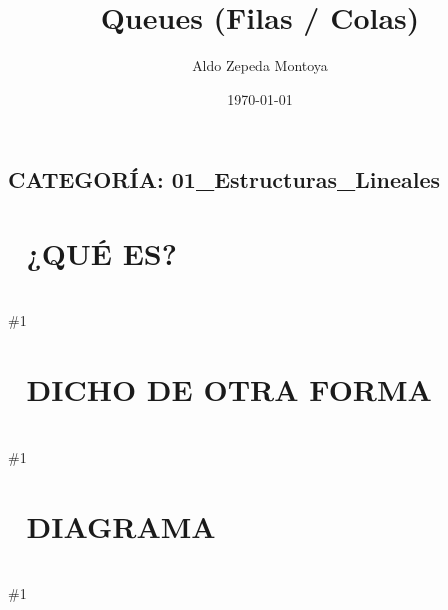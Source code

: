 \documentclass{article}
\newcommand{\quees}[1]{
    \section*{🤔 ¿QUÉ ES?}
    \hrulefill \\
    \#1
}
\newcommand{\dichodeotraforma}[1]{
    \section*{💬 DICHO DE OTRA FORMA}
    \hrulefill \\
    \#1
}
\newcommand{\diagrama}[1]{
    \section*{🎨 DIAGRAMA}
    \hrulefill \\
    \#1
}
\begin{document}
\title{Queues (Filas / Colas)}
\author{Aldo Zepeda Montoya}
\date{\today}
\maketitle

\subsection*{CATEGORÍA: 01\_Estructuras\_Lineales}

\quees{
La fila para entrar al cine 🎟️ o al banco 🏦. El primero que llega 
es el primero en ser atendido. No puedes "colarte" al frente; llegas 
al final y esperas tu turno.

Es una estructura "FIFO" (First In, First Out): el primero que entra
es el primero en salir. Es lo opuesto al Stack.
}

\dichodeotraforma{
Una Queue es una estructura lineal que restringe el acceso:
- Solo puedes AGREGAR (Enqueue) por el final (Back/Rear).
- Solo puedes QUITAR (Dequeue) por el frente (Front).

Existen variaciones importantes:
1. Deque: Puedes insertar/eliminar por ambos extremos.
2. Priority Queue: Los elementos salen según su importancia, no 
   solo por orden de llegada (implementada usualmente con un Heap).
}

\diagrama{\begin{verbatim}
enqueue(A) → enqueue(B) → enqueue(C)

FRONT                    BACK
  ↓                       ↓
 [A] ──→ [B] ──→ [C]

dequeue() → devuelve A y lo quita, queda:

FRONT         BACK
  ↓             ↓
 [B] ──→ [C]
\end{verbatim}}
\end{document}
